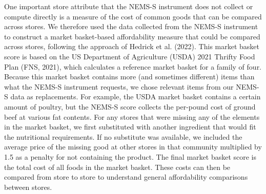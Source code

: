 \documentclass[
  letterpaper,
  authoryear,
  review,
  3p]{elsarticle}
\begin{document}
One important store attribute that the NEMS-S instrument does not
collect or compute directly is a measure of the cost of common goods
that can be compared across stores. We therefore used the data collected
from the NEMS-S instrument to construct a market basket-based
affordability measure that could be compared across stores, following
the approach of Hedrick et al. (2022). This market basket score is based
on the US Department of Agriculture (USDA) 2021 Thrifty Food Plan (FNS,
2021), which calculates a reference market basket for a family of four.
Because this market basket contains more (and sometimes different) items
than what the NEMS-S instrument requests, we chose relevant items from
our NEMS-S data as replacements. For example, the USDA market basket
contains a certain amount of poultry, but the NEMS-S score collects the
per-pound cost of ground beef at various fat contents. For any stores
that were missing any of the elements in the market basket, we first
substituted with another ingredient that would fit the nutritional
requirements. If no substitute was available, we included the average
price of the missing good at other stores in that community multiplied
by 1.5 as a penalty for not containing the product. The final market
basket score is the total cost of all foods in the market basket. These
costs can then be compared from store to store to understand general
affordability comparisons between stores.
\end{document}
